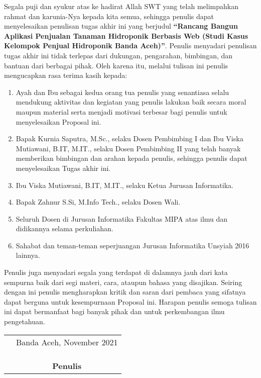 \preface %


Segala puji dan syukur atas ke hadirat Allah SWT yang telah melimpahkan rahmat dan karunia-Nya kepada kita semua, sehingga penulis dapat menyelesaikan penulisan tugas akhir ini yang berjudul \textbf{“Rancang Bangun Aplikasi Penjualan Tanaman Hidroponik Berbasis Web (Studi Kasus Kelompok Penjual Hidroponik Banda Aceh)”}. Penulis menyadari penulisan tugas akhir ini tidak terlepas dari dukungan, pengarahan, bimbingan, dan bantuan dari berbagai pihak. Oleh karena itu, melalui tulisan ini penulis mengucapkan rasa terima kasih kepada:

\begin{enumerate}
	\item{Ayah dan Ibu sebagai kedua orang tua penulis yang senantiasa selalu mendukung aktivitas dan kegiatan yang penulis lakukan baik secara moral maupun material serta menjadi motivasi terbesar bagi penulis untuk menyelesaikan Proposal ini.}
	\item{Bapak Kurnia Saputra, M.Sc., selaku Dosen Pembimbing I dan Ibu Viska Mutiawani, B.IT, M.IT., selaku Dosen Pembimbing II yang telah banyak memberikan bimbingan dan arahan kepada penulis, sehingga penulis dapat menyelesaikan Tugas akhir ini.}
	\item {Ibu Viska Mutiawani, B.IT, M.IT., selaku Ketua Jurusan Informatika.}
	\item{Bapak Zahnur S.Si, M.Info Tech., selaku Dosen Wali.}
	\item{Seluruh Dosen di Jurusan Informatika Fakultas MIPA atas ilmu dan didikannya selama perkuliahan.}
	\item{Sahabat dan teman-teman seperjuangan Jurusan Informatika Unsyiah 2016 lainnya.}
\end{enumerate}


Penulis juga menyadari segala yang terdapat di dalamnya jauh dari kata sempurna baik dari segi materi, cara, ataupun bahasa yang disajikan. Seiring dengan ini penulis mengharapkan kritik dan saran dari pembaca yang sifatnya dapat berguna untuk kesempurnaan Proposal ini. Harapan penulis semoga tulisan ini dapat bermanfaat bagi banyak pihak dan untuk perkembangan ilmu pengetahuan.

\vspace{1cm}


\begin{tabular}{p{7.5cm}c}
	&Banda Aceh, November 2021\\
	&\\
	&\\
	&\\
	&\textbf{Penulis}
\end{tabular}